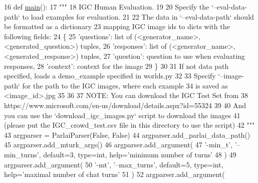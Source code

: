 \begin{DoxyCode}
16 \textcolor{keyword}{def }\hyperlink{namespaceprojects_1_1wizard__of__wikipedia_1_1mturk__evaluation__task_1_1run_ad3ab2c71f8083c3112815c0b363d316b}{main}():
17     \textcolor{stringliteral}{"""}
18 \textcolor{stringliteral}{    IGC Human Evaluation.}
19 \textcolor{stringliteral}{}
20 \textcolor{stringliteral}{    Specify the `--eval-data-path` to load examples for evaluation.}
21 \textcolor{stringliteral}{}
22 \textcolor{stringliteral}{    The data in `--eval-data-path` should be formatted as a dictionary}
23 \textcolor{stringliteral}{    mapping IGC image ids to dicts with the following fields:}
24 \textcolor{stringliteral}{    \{}
25 \textcolor{stringliteral}{        'questions': list of (<generator\_name>, <generated\_question>) tuples,}
26 \textcolor{stringliteral}{        'responses': list of (<generator\_name>, <generated\_response>) tuples,}
27 \textcolor{stringliteral}{        'question': question to use when evaluating responses,}
28 \textcolor{stringliteral}{        'context': context for the image}
29 \textcolor{stringliteral}{    \}}
30 \textcolor{stringliteral}{}
31 \textcolor{stringliteral}{    If not data path specified, loads a demo\_example specified in worlds.py}
32 \textcolor{stringliteral}{}
33 \textcolor{stringliteral}{    Specify `--image-path` for the path to the IGC images, where each example}
34 \textcolor{stringliteral}{    is saved as <image\_id>.jpg}
35 \textcolor{stringliteral}{}
36 \textcolor{stringliteral}{}
37 \textcolor{stringliteral}{    NOTE: You can download the IGC Test Set from}
38 \textcolor{stringliteral}{        https://www.microsoft.com/en-us/download/details.aspx?id=55324}
39 \textcolor{stringliteral}{}
40 \textcolor{stringliteral}{    And you can use the `download\_igc\_images.py` script to download the images}
41 \textcolor{stringliteral}{    (please put the IGC\_crowd\_test.csv file in this directory to use the script)}
42 \textcolor{stringliteral}{    """}
43     argparser = ParlaiParser(\textcolor{keyword}{False}, \textcolor{keyword}{False})
44     argparser.add\_parlai\_data\_path()
45     argparser.add\_mturk\_args()
46     argparser.add\_argument(
47         \textcolor{stringliteral}{'-min\_t'}, \textcolor{stringliteral}{'--min\_turns'}, default=3, type=int, help=\textcolor{stringliteral}{'minimum number of turns'}
48     )
49     argparser.add\_argument(
50         \textcolor{stringliteral}{'-mt'}, \textcolor{stringliteral}{'--max\_turns'}, default=5, type=int, help=\textcolor{stringliteral}{'maximal number of chat turns'}
51     )
52     argparser.add\_argument(

\end{DoxyCode}
